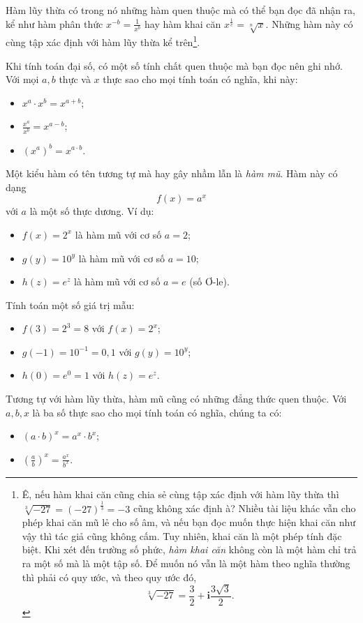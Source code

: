 \documentclass[a4paper, titlepage, openany]{book}
\begin{document}
Hàm lũy thừa có trong nó những hàm quen thuộc mà có thể bạn đọc đã nhận ra, kể như hàm phân thức $x^{-b} = \frac{1}{x^b}$ hay hàm khai căn $x^{\frac{1}{c}} = \sqrt[n]{x}$. Những hàm này có cùng tập xác định với hàm lũy thừa kể trên\footnote{Ê, nếu hàm khai căn cũng chia sẻ cùng tập xác định với hàm lũy thừa thì $\sqrt[3]{-27} = (-27)^{\frac{1}{3}} = -3$ cũng không xác định à? Nhiều tài liệu khác vẫn cho phép khai căn mũ lẻ cho số âm, và nếu bạn đọc muốn thực hiện khai căn như vậy thì tác giả cũng không cấm. Tuy nhiên, khai căn là một phép tính đặc biệt. Khi xét đến trường số phức, \textit{hàm khai căn} không còn là một hàm chỉ trả ra một số mà là một tập số. Để muốn nó vẫn là một hàm theo nghĩa thường thì phải có quy ước, và theo quy ước đó, $$\sqrt[3]{-27} = \frac{3}{2} + \mathbf{i}\frac{3\sqrt{3}}{2}.$$}.

Khi tính toán đại số, có một số tính chất quen thuộc mà bạn đọc nên ghi nhớ. Với mọi $a, b$ thực và $x$ thực sao cho mọi tính toán có nghĩa, khi này:
\begin{itemize}
   \item $x^a\cdot x^b = x^{a+b}$;
   \item $\frac{x^a}{x^b} = x^{a - b}$;
   \item $(x^a)^b = x^{a\cdot b}$.
\end{itemize}

Một kiểu hàm có tên tương tự mà hay gây nhầm lẫn là \emph{hàm mũ}. Hàm này có dạng $$f(x) = a^x$$ với $a$ là một số thực dương. Ví dụ:
\begin{itemize}
   \item $f(x) = 2^x$ là hàm mũ với cơ số $a = 2$;
   \item $g(y) = 10^y$ là hàm mũ với cơ số $a = 10$;
   \item $h(z) = e^z$ là hàm mũ với cơ số $a = e$ (số Ơ-le).
\end{itemize}
Tính toán một số giá trị mẫu:
\begin{itemize}
   \item $f(3) = 2^3 = 8$ với $f(x) = 2^x$;
   \item $g(-1) = 10^{-1} = 0,1$ với $g(y) = 10^y$;
   \item $h(0) = e^0 = 1$ với $h(z) = e^z$.
\end{itemize}
Tương tự với hàm lũy thừa, hàm mũ cũng có những đẳng thức quen thuộc. Với $a, b, x$ là ba số thực sao cho mọi tính toán có nghĩa, chúng ta có:
\begin{itemize}
   \item $(a\cdot b)^x=a^x\cdot b^x$;
   \item $\left(\frac{a}{b}\right)^x = \frac{a^x}{b^x}$.
\end{itemize}
\end{document}
